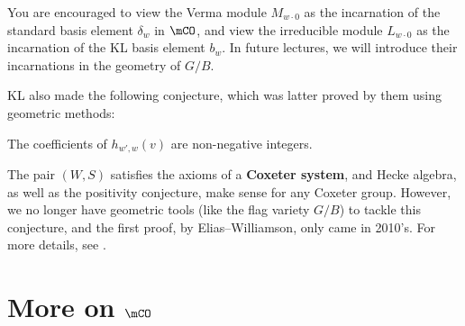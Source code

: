 \begin{rem}
	You are encouraged to view the Verma module $M_{w\cdot 0}$ as the incarnation of the standard basis element $\delta_w$ in $\mCO$, and view the irreducible module $L_{w\cdot 0}$ as the incarnation of the KL basis element $b_w$. In future lectures, we will introduce their incarnations in the geometry of $G/B$.
\end{rem}

	KL also made the following conjecture, which was latter proved by them using geometric methods:

\begin{conje}[KL Positivity]
	The coefficients of $h_{w',w}(v)$ are non-negative integers.
\end{conje}

\begin{rem}
	The pair $(W,S)$ satisfies the axioms of a \textbf{Coxeter system}, and Hecke algebra, as well as the positivity conjecture, make sense for any Coxeter group. However, we no longer have geometric tools (like the flag variety $G/B$) to tackle this conjecture, and the first proof, by Elias--Williamson, only came in 2010's. For more details, see \cite{EMTW}.
\end{rem}

\section{More on \texorpdfstring{$\mCO$}{O}}

